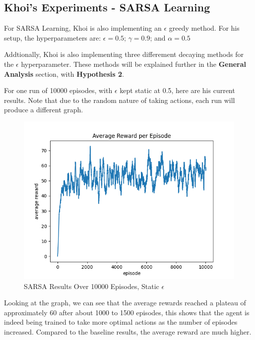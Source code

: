 

\subsection{Khoi's Experiments - SARSA Learning}
For SARSA Learning, Khoi is also implementing an $\epsilon$ greedy method. For his setup, the hyperparameters are: $\epsilon = 0.5$; $\gamma = 0.9$; and $\alpha = 0.5$

Addtionally, Khoi is also implementing three differement decaying methods for the $\epsilon$ hyperparameter. These methods will be explained further in the \textbf{General Analysis} section, with \textbf{Hypothesis 2}.

For one run of 10000 episodes, with $\epsilon$ kept static at 0.5, here are his current results. Note that due to the random nature of taking actions, each run will produce a different graph.

\begin{figure}[H] %
    \centering
    \includegraphics[width=0.75\linewidth]{sarsa-average-10k-epsilon05.png}
    \caption{SARSA Results Over 10000 Episodes, Static $\epsilon$}
\end{figure}

Looking at the graph, we can see that the average rewards reached a plateau of approximately 60 after about 1000 to 1500 episodes, this shows that the agent is indeed being trained to
take more optimal actions as the number of episodes increased. Compared to the baseline results, the average reward are much higher.

